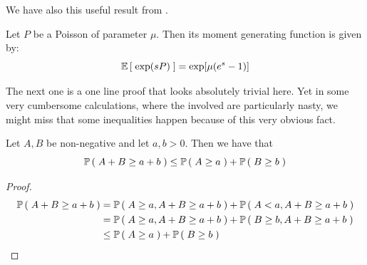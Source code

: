 We have also this useful result from \cite[Equation (1.6-9)]{handbook-poisson}.

\begin{lemma}
	\label{app:Poisson-generating-function}
	Let $P$ be a Poisson \rv of parameter $\mu$.
	Then its moment generating function is given by:
	\begin{equation*}
		\mathbb{E} \left[ \; \exp(sP) \; \right] =  \exp[\mu(e^s-1)]
	\end{equation*}
\end{lemma}

The next one is a one line proof that looks absolutely trivial here. 
Yet in some very cumbersome calculations, where the \rv involved are particularly nasty, we might miss that some inequalities happen because of this very obvious fact.

\begin{lemma}\label{app:pA-pB-less-than}
	Let $A,B$ be non-negative \rv and let $a,b > 0$.
	Then we have that
	\begin{equation*}
		\mathbb{P} \left( \; A+B \geq a +b \; \right) \leq \mathbb{P} \left( \; A \geq a \; \right) + \mathbb{P} \left( \; B \geq b \; \right)
	\end{equation*}	
\end{lemma}

\begin{proof}
	\begin{align*}
		\mathbb{P} \left( \; A+B \geq a +b \; \right) &= 
		\mathbb{P} \left( \; A \geq a, A+B \geq a +b \; \right) + \mathbb{P} \left( \; A < a, A+B \geq a +b \; \right) 
		\\
		&=
		\mathbb{P} \left( \; A \geq a, A+B \geq a +b \; \right) + \mathbb{P} \left( \; B \geq b, A+B \geq a +b \; \right) 
		\\
		&\leq
		\mathbb{P} \left( \; A \geq a \; \right) + \mathbb{P} \left( \; B \geq b \; \right)
	\end{align*}	
\end{proof}
